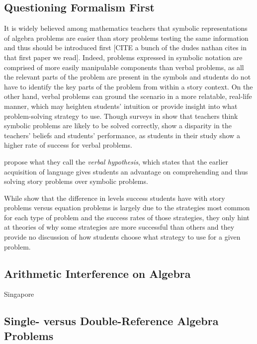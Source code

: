 \documentclass[10pt,letterpaper]{article}
\begin{document}
\subsection{Questioning Formalism First}

It is widely believed among mathematics teachers that symbolic representations of algebra problems are easier than story problems testing the same information and thus should be introduced first [CITE a bunch of the dudes nathan cites in that first paper we read]. Indeed, problems expressed in symbolic notation are comprised of more easily manipulable components than verbal problems, as all the relevant parts of the problem are present in the symbols and students do not have to identify the key parts of the problem from within a story context. On the other hand, verbal problems can ground the scenario in a more relatable, real-life manner, which may heighten students’ intuition or provide insight into what problem-solving strategy to use. Though surveys in  show that teachers think symbolic problems are likely to be solved correctly,  show a disparity in the teachers' beliefs and students' performance, as students in their study show a higher rate of success for verbal problems.

 propose what they call the \textit{verbal hypothesis}, which states that the earlier acquisition of language gives students an advantage on comprehending and thus solving story problems over symbolic problems. 

While  show that the difference in levels success students have with story problems versus equation problems is largely due to the strategies most common for each type of problem and the success rates of those strategies, they only hint at theories of why some strategies are more successful than others and they provide no discussion of how students choose what strategy to use for a given problem.

\subsection{Arithmetic Interference on Algebra}

Singapore

\subsection{Single- versus Double-Reference Algebra Problems}
\end{document}
